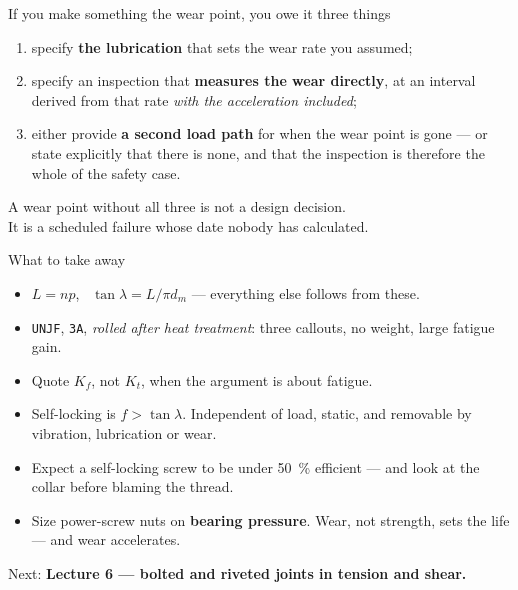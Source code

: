 \documentclass[aspectratio=169,10pt]{beamer}
\begin{document}
\begin{frame}{If you make something the wear point, you owe it three things}
\begin{enumerate}
  \item specify \textbf{the lubrication} that sets the wear rate you assumed;
  \item specify an inspection that \textbf{measures the wear directly}, at an interval derived from
        that rate \emph{with the acceleration included};
  \item either provide \textbf{a second load path} for when the wear point is gone --- or state
        explicitly that there is none, and that the inspection is therefore the whole of the safety
        case.
\end{enumerate}
\vfill
\begin{alertblock}{}
\centering A wear point without all three is not a design decision.\\
It is a scheduled failure whose date nobody has calculated.
\end{alertblock}
\end{frame}

\begin{frame}{What to take away}
\begin{itemize}
  \item $L = np$, \ $\tan\lambda = L/\pi d_m$ --- everything else follows from these.
  \item \texttt{UNJF}, \texttt{3A}, \emph{rolled after heat treatment}: three callouts, no weight, large
        fatigue gain.
  \item Quote $K_f$, not $K_t$, when the argument is about fatigue.
  \item Self-locking is $f > \tan\lambda$. Independent of load, static, and removable by vibration,
        lubrication or wear.
  \item Expect a self-locking screw to be under \SI{50}{\percent} efficient --- and look at the collar
        before blaming the thread.
  \item Size power-screw nuts on \textbf{bearing pressure}. Wear, not strength, sets the life --- and
        wear accelerates.
\end{itemize}
\vfill
\centering\small Next: \textbf{Lecture 6 --- bolted and riveted joints in tension and shear.}
\end{frame}
\end{document}
